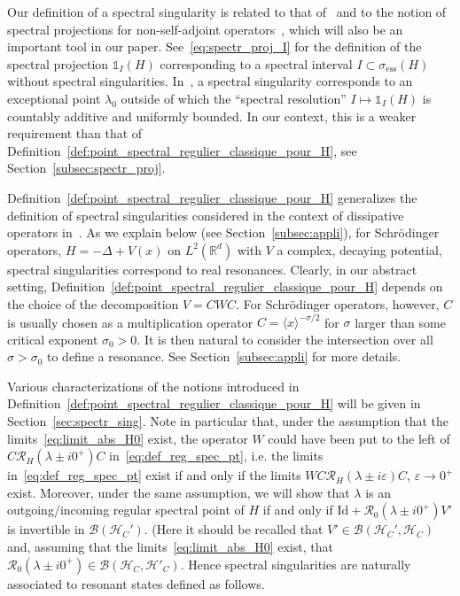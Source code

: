 \documentclass[10pt]{amsart}
\theoremstyle{definition}\newtheorem{defi}[theo]{Definition}\newtheorem{rema}[theo]{Remark}\newtheorem{exam}[theo]{Example}\newtheorem{exem}[theo]{Example}\newtheorem{nota}[theo]{Notation}
\newcommand{\Hi}{\mathcal{H}}
\newcommand{\R}{\mathbb{R}}
\newcommand{\ess}{\mathrm{ess}}
\newcommand{\Res}{\mathcal{R}}
\newcommand{\clB}{\mathcal{B}}
\begin{document}
Our definition of a spectral singularity is related to that of~\cite{Sc60_01} and to the notion of spectral projections for non-self-adjoint operators~\cite{Du58_01}, which will also be an important tool in our paper. See~\eqref{eq:spectr_proj_I} for the definition of the spectral projection $\mathds{1}_I(H)$ corresponding to a spectral interval $I\subset\sigma_{\ess}(H)$ without spectral singularities. In~\cite{Sc60_01}, a spectral singularity corresponds to an exceptional point $\lambda_0$ outside of which the ``spectral resolution'' $I \mapsto \mathds{1}_I(H)$ is countably additive and uniformly bounded. In our context, this is a weaker requirement than that of Definition~\ref{def:point_spectral_regulier_classique_pour_H}, see Section~\ref{subsec:spectr_proj}.

Definition~\ref{def:point_spectral_regulier_classique_pour_H} generalizes the definition of spectral singularities considered in the context of dissipative operators in~\cite{Fa21_01,FaFr18_01,FaNi18_01}. As we explain below (see Section~\ref{subsec:appli}), for Schr\"odinger operators, $H=-\Delta+V(x)$ on $L^2(\R^d)$ with $V$ a complex, decaying potential, spectral singularities correspond to real resonances. Clearly, in our abstract setting, Definition~\ref{def:point_spectral_regulier_classique_pour_H} depends on the choice of the decomposition $V=CWC$. For Schr\"odinger operators, however, $C$ is usually chosen as a multiplication operator $C=\langle x\rangle^{-\sigma/2}$ for $\sigma$ larger than some critical exponent $\sigma_0>0$. It is then natural to consider the intersection over all $\sigma>\sigma_0$ to define a resonance. See Section~\ref{subsec:appli} for more details.

Various characterizations of the notions introduced in Definition~\ref{def:point_spectral_regulier_classique_pour_H} will be given in Section~\ref{sec:spectr_sing}. Note in particular that, under the assumption that the limits~\eqref{eq:limit_abs_H0} exist, the operator $W$ could have been put to the left of $C\Res_H(\lambda\pm i0^+)C$ in~\eqref{eq:def_reg_spec_pt}, i.e. the limits in~\eqref{eq:def_reg_spec_pt} exist if and only if the limits $WC\Res_H(\lambda\pm i\varepsilon)C$, $\varepsilon\to0^+$ exist. Moreover, under the same assumption, we will show that $\lambda$ is an outgoing/incoming regular spectral point of $H$ if and only if $\mathrm{Id}+\Res_0(\lambda\pm i0^+)V'$ is invertible in $\clB(\Hi_C')$. (Here it should be recalled that $V'\in\clB(\Hi_C',\Hi_C)$ and, assuming that the limits~\eqref{eq:limit_abs_H0} exist, that $\Res_0(\lambda\pm i0^+)\in\clB(\Hi_C,\Hi'_C)$. Hence spectral singularities are naturally associated to resonant states defined as follows.
\end{document}
